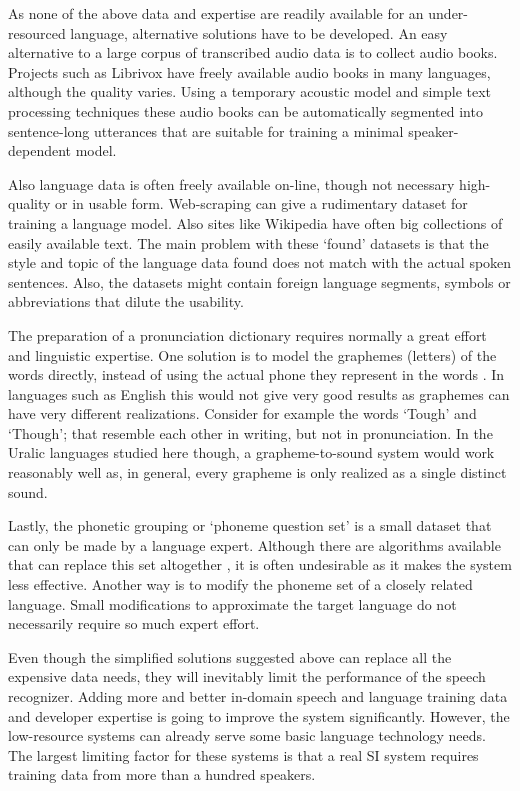\documentclass[b5paper]{article}
\begin{document}
As none of the above data and expertise are readily available for an under-resourced language, alternative solutions have to be developed. An easy alternative to a large corpus of transcribed audio data is to collect audio books. Projects such as Librivox have freely available audio books in many languages, although the quality varies. Using a temporary acoustic model and simple text processing techniques these audio books can be automatically segmented into sentence-long utterances that are suitable for training a minimal speaker-dependent model.

Also language data is often freely available on-line, though not necessary high-quality or in usable form. Web-scraping \cite{scannell2007crubadan} can give a rudimentary dataset for training a language model. Also sites like Wikipedia have often big collections of easily available text. The main problem with these `found' datasets is that the style and topic of the language data found does not match with the actual spoken sentences. Also, the datasets might contain foreign language segments, symbols or abbreviations that dilute the usability.

The preparation of a pronunciation dictionary requires normally a great effort and linguistic expertise. One solution is to model the graphemes (letters) of the words directly, instead of using the actual phone they represent in the words \cite{kanthak2003multilingual}. In languages such as English this would not give very good results as graphemes can have very different realizations. Consider for example the words `Tough' and `Though'; that resemble each other in writing, but not in pronunciation. In the Uralic languages studied here though, a grapheme-to-sound system would work reasonably well as, in general, every grapheme is only realized as a single distinct sound.

Lastly, the phonetic grouping or `phoneme question set' is a small dataset that can only be made by a language expert. Although there are algorithms available that can replace this set altogether \cite{darjaa2011effective}, it is often undesirable as it makes the system less effective. Another way is to modify the phoneme set of a closely related language. Small modifications to approximate the target language do not necessarily require so much expert effort.

Even though the simplified solutions suggested above can replace all the expensive data needs, they will inevitably limit the performance of the speech recognizer. Adding more and better in-domain speech and language training data and developer expertise is going to improve the system significantly. However, the low-resource systems can already serve some basic language technology needs. The largest limiting factor for these systems is that a real SI system requires training data from more than a hundred speakers.
\end{document}

